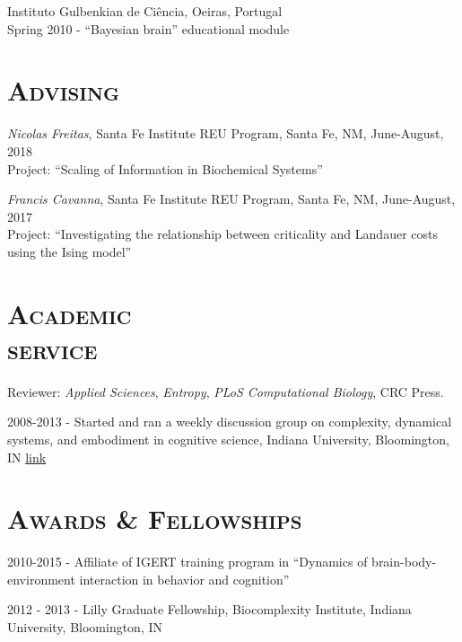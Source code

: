 \documentclass[margin,line,centered]{res}
\begin{document}
\begin{resume}
Instituto Gulbenkian de Ciência, Oeiras, Portugal\\
\hangindent=10pt Spring 2010 - ``Bayesian brain'' educational module


\section{\textsc{Advising}}
\emph{Nicolas Freitas}, Santa Fe Institute REU Program, Santa Fe, NM, June-August, 2018 \\
Project: ``Scaling of Information in Biochemical Systems''

\emph{Francis Cavanna}, Santa Fe Institute REU Program, Santa Fe, NM, June-August, 2017 \\
Project: ``Investigating the relationship between criticality and Landauer costs using the Ising model''

\section{\textsc{Academic\\service}}

{Reviewer}: \emph{Applied Sciences}, \emph{Entropy}, \emph{PLoS Computational Biology}, CRC Press.

2008-2013 - Started and ran a weekly discussion group on complexity, dynamical systems, and embodiment in cognitive science, Indiana University, Bloomington, IN \href{http://apophenia.wikidot.com/}{link}

\section{\textsc{Awards \& Fellowships}}
2010-2015 - Affiliate of IGERT training program in ``Dynamics of brain-body-environment interaction in behavior and cognition'' 

2012 - 2013 - Lilly Graduate Fellowship, Biocomplexity Institute, Indiana University, Bloomington, IN


\end{resume}
\end{document}
